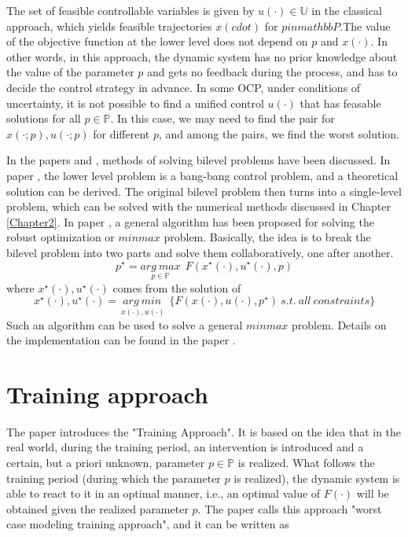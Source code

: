 \documentclass  [
  paper    = a4,
  BCOR     = 10mm,
  twoside,
  fontsize = 12pt,
  fleqn,
  toc      = bibnumbered,
  toc      = listofnumbered,
  numbers  = noendperiod,
  headings = normal,
  listof   = leveldown,
  version  = 3.03
]                                       {scrreprt}
\newcommand{\<}{\langle}
\renewcommand{\>}{\rangle}
\begin{document}
The set of feasible controllable variables is given by $u(\cdot) \in \mathbb{U}$ in the classical approach, which yields feasible trajectories $x(cdot)$ for $p in mathbbP$.The value of the objective function at the lower level does not depend on $p$ and $x(\cdot)$. In other words, in this approach, the dynamic system has no prior knowledge about the value of the parameter $p$ and gets no feedback during the process, and has to decide the control strategy in advance. In some OCP, under conditions of uncertainty, it is not possible to find a unified control $u(\cdot)$ that has feasable solutions for all $p \in  \mathbb{P}$. In this case, we may need to find the pair for $x(\cdot;p), u(\cdot;p)$ for different $p$, and among the pairs, we find the worst solution.


In the papers \cite{Mas14} and \cite{KM16}, methods of solving bilevel problems have been discussed. In paper \cite{KM16}, the lower level problem is a bang-bang control problem, and a theoretical solution can be derived. The original bilevel problem then turns into a single-level problem, which can be solved with the numerical methods discussed in Chapter \ref{Chapter2}. In paper \cite{Mas14}, a general algorithm has been proposed for solving the robust optimization or $minmax$ problem. Basically, the idea is to break the bilevel problem into two parts and solve them collaboratively, one after another.
\begin{equation}
	   p^\star = \underset{p \in  \mathbb{P} }{arg\ max}   \ \ F(x^\star(\cdot), u^\star(\cdot), p)
\end{equation}
where $x^\star(\cdot), u^\star(\cdot)$ comes from the solution of 
\begin{equation}
	x^\star(\cdot), u^\star(\cdot) = \underset{\ x(\cdot), u(\cdot)}{arg\ min}   \ \ \{F(x(\cdot), u(\cdot), p^\star) \ s.t. \  all \ constraints \}
\end{equation}
Such an algorithm can be used to solve a general $minmax$ problem. Details on the implementation can be found in the paper \cite{Mas14}.


\section{Training approach}
The paper \cite{MatSch22} introduces the "Training Approach". It is based on the idea that in the real world, during the training period, an intervention is introduced and a certain, but a priori unknown, parameter $p \in \mathbb{P}$ is realized. What follows the training period (during which the parameter $p$ is realized), the dynamic system is able to react to it in an optimal manner, i.e., an optimal value of $ F(\cdot)$ will be obtained given the realized parameter $p$. The paper \cite{MatSch22} calls this approach "worst case modeling training approach", and it can be written as
\end{document}
